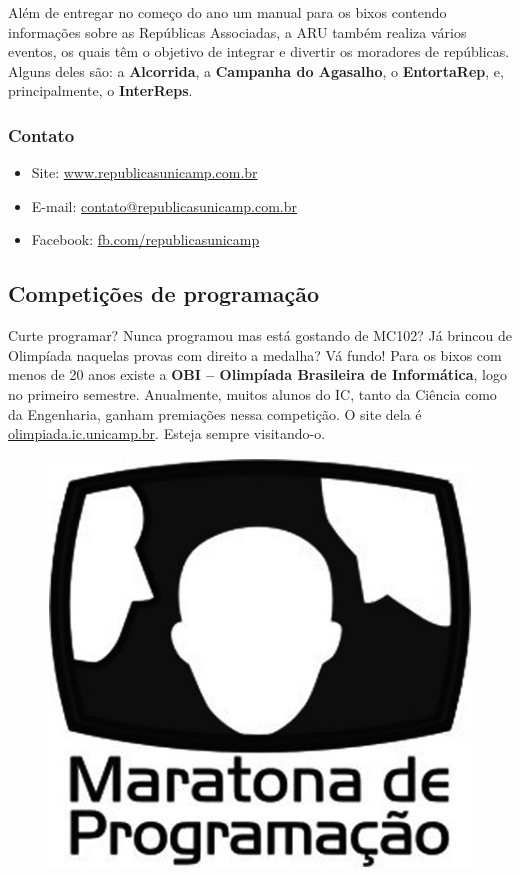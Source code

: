 Além de entregar no começo do ano um manual para os bixos contendo informações
sobre as Repúblicas Associadas, a ARU também realiza vários eventos, os quais
têm o objetivo de integrar e divertir os moradores de repúblicas. Alguns deles
são: a \textbf{Alcorrida}, a \textbf{Campanha do Agasalho},
o \textbf{EntortaRep}, e, principalmente, o \textbf{InterReps}.

\subsubsection{Contato}

\begin{itemize}
    \item Site: \url{www.republicasunicamp.com.br}
    \item E-mail: \url{contato@republicasunicamp.com.br}
    \item Facebook: \url{fb.com/republicasunicamp}
\end{itemize}

\subsection{Competições de programação}

Curte programar? Nunca programou mas está gostando de MC102? Já brincou de
Olimpíada naquelas provas com direito a medalha? Vá fundo! Para os bixos
com menos de 20 anos existe a \textbf{OBI -- Olimpíada Brasileira de Informática}, logo no primeiro
semestre. Anualmente, muitos alunos do IC, tanto da Ciência como da Engenharia, ganham premiações
nessa competição. O site dela é \url{olimpiada.ic.unicamp.br}. Esteja
sempre visitando-o.

\begin{figure}[h!]
    \centering
    \includegraphics[scale=0.40, keepaspectratio=true]{img/maratona.png}
\end{figure}

